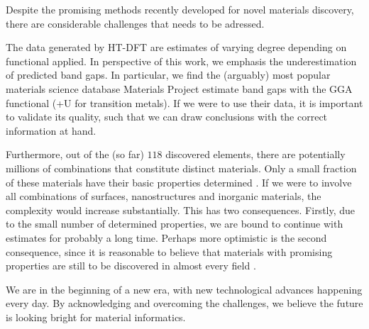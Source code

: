 
Despite the promising methods recently developed for novel materials discovery, there are considerable challenges that needs to be adressed.

The data generated by HT-DFT are estimates of varying degree depending on functional applied. In perspective of this work, we emphasis the underestimation of predicted band gaps. In particular, we find the (arguably) most popular materials science database Materials Project estimate band gaps with the GGA functional (+U for transition metals). If we were to use their data, it is important to validate its quality, such that we can draw conclusions with the correct information at hand.

Furthermore, out of the (so far) $118$ discovered elements, there are potentially millions of combinations that constitute distinct materials. Only a small fraction of these materials have their basic properties determined \cite{Springer2017}. If we were to involve all combinations of surfaces, nanostructures and inorganic materials, the complexity would increase substantially. This has two consequences. Firstly, due to the small number of determined properties, we are bound to continue with estimates for probably a long time. Perhaps more optimistic is the second consequence, since it is reasonable to believe that materials with promising properties are still to be discovered in almost every field \cite{Pedregosa2012}.

We are in the beginning of a new era, with new technological advances happening every day. By acknowledging and overcoming the challenges, we believe the future is looking bright for material informatics.
